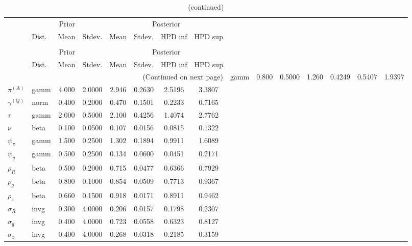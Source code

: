  
\begin{center}
\begin{longtable}{llcccccc} 
\caption{Results from Metropolis-Hastings (parameters)}
 \label{Table:MHPosterior:1}\\
\toprule 
  & \multicolumn{3}{c}{Prior}  &  \multicolumn{4}{c}{Posterior} \\
  \cmidrule(r{.75em}){2-4} \cmidrule(r{.75em}){5-8}
  & Dist. & Mean  & Stdev. & Mean & Stdev. & HPD inf & HPD sup\\
\midrule \endfirsthead 
\caption{(continued)}\\\toprule 
  & \multicolumn{3}{c}{Prior}  &  \multicolumn{4}{c}{Posterior} \\
  \cmidrule(r{.75em}){2-4} \cmidrule(r{.75em}){5-8}
  & Dist. & Mean  & Stdev. & Mean & Stdev. & HPD inf & HPD sup\\
\midrule \endhead 
\bottomrule \multicolumn{8}{r}{(Continued on next page)} \endfoot 
\bottomrule \endlastfoot 
${r_{A}}$ & gamm &   0.800 & 0.5000 &   1.260& 0.4249 &  0.5407 &  1.9397 \\ 
${\pi^{(A)}}$ & gamm &   4.000 & 2.0000 &   2.946& 0.2630 &  2.5196 &  3.3807 \\ 
${\gamma^{(Q)}}$ & norm &   0.400 & 0.2000 &   0.470& 0.1501 &  0.2233 &  0.7165 \\ 
${\tau}$ & gamm &   2.000 & 0.5000 &   2.100& 0.4256 &  1.4074 &  2.7762 \\ 
${\nu}$ & beta &   0.100 & 0.0500 &   0.107& 0.0156 &  0.0815 &  0.1322 \\ 
${\psi_\pi}$ & gamm &   1.500 & 0.2500 &   1.302& 0.1894 &  0.9911 &  1.6089 \\ 
${\psi_y}$ & gamm &   0.500 & 0.2500 &   0.134& 0.0600 &  0.0451 &  0.2171 \\ 
${\rho_R}$ & beta &   0.500 & 0.2000 &   0.715& 0.0477 &  0.6366 &  0.7929 \\ 
${\rho_{g}}$ & beta &   0.800 & 0.1000 &   0.854& 0.0509 &  0.7713 &  0.9367 \\ 
${\rho_z}$ & beta &   0.660 & 0.1500 &   0.918& 0.0171 &  0.8911 &  0.9462 \\ 
${\sigma_R}$ & invg &   0.300 & 4.0000 &   0.206& 0.0157 &  0.1798 &  0.2307 \\ 
${\sigma_{g}}$ & invg &   0.400 & 4.0000 &   0.723& 0.0558 &  0.6323 &  0.8127 \\ 
${\sigma_z}$ & invg &   0.400 & 4.0000 &   0.268& 0.0318 &  0.2185 &  0.3159 \\ 
\end{longtable}
 \end{center}
